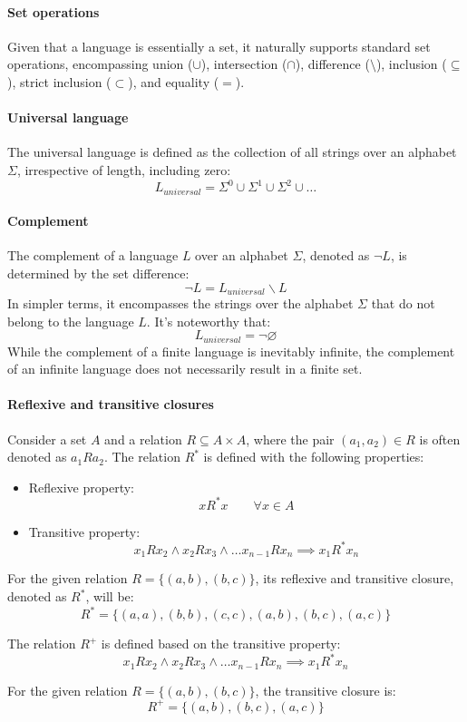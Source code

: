 \paragraph*{Set operations}  
Given that a language is essentially a set, it naturally supports standard set operations, encompassing union ($\cup$), intersection ($\cap$), difference ($ \setminus $), inclusion ($ \subseteq $), strict inclusion ($ \subset $), and equality ($=$). 

\paragraph*{Universal language} 
The universal language is defined as the collection of all strings over an alphabet $\Sigma$, irrespective of length, including zero:
\[L_{universal}=\Sigma ^0 \cup \Sigma ^1 \cup \Sigma ^2 \cup \dots \]

\paragraph*{Complement} 
The complement of a language $L$ over an alphabet $\Sigma$, denoted as $\lnot L$, is determined by the set difference:
\[\lnot L=L_{universal}\backslash L\]
In simpler terms, it encompasses the strings over the alphabet $\Sigma$ that do not belong to the language $L$.
It's noteworthy that:
\[L_{universal} = \lnot \varnothing\]
While the complement of a finite language is inevitably infinite, the complement of an infinite language does not necessarily result in a finite set.

\paragraph*{Reflexive and transitive closures} 
Consider a set $A$ and a relation $R \subseteq A \times A$, where the pair $(a_1, a_2) \in R$ is often denoted as $a_1Ra_2$.
The relation $R^{*}$ is defined with the following properties:
\begin{itemize}
    \item Reflexive property:
        \[xR^{*}x \qquad \forall x \in A\]
    \item Transitive property: 
        \[x_1Rx_2 \land x_2Rx_3 \land \dots x_{n-1}Rx_n \implies x_1R^{*}x_n\]
\end{itemize}
\begin{example}
    For the given relation $R = \{(a, b), (b, c)\}$, its reflexive and transitive closure, denoted as $R^{*}$, will be:
    \[R^{*} = \{(a, a), (b, b), (c, c), (a, b), (b, c), (a, c) \}\]
\end{example}
The relation $R^{+}$  is defined based on the transitive property:
\[x_1Rx_2 \land x_2Rx_3 \land \dots x_{n-1}Rx_n \implies x_1R^{*}x_n\]
\begin{example}
    For the given relation $R = \{(a, b), (b, c)\}$, the transitive closure is: 
    \[R^{+} = \{ (a, b), (b, c), (a, c)\}\]
\end{example}

